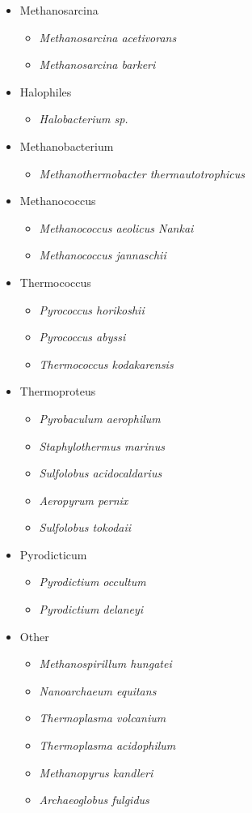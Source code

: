 \documentclass[10pt,letterpaper]{article}
\begin{document}
\begin{itemize}
	\item Methanosarcina
	\begin{itemize}
		\item \textit{Methanosarcina acetivorans}
		\item \textit{Methanosarcina barkeri}
	\end{itemize}
	\item Halophiles
	\begin{itemize}
		\item \textit{Halobacterium sp.}
	\end{itemize}
	\item Methanobacterium
	\begin{itemize}
		\item \textit{Methanothermobacter thermautotrophicus}
	\end{itemize}
	\item Methanococcus
	\begin{itemize}
		\item \textit{Methanococcus aeolicus Nankai}
		\item \textit{Methanococcus jannaschii}
	\end{itemize}
	\item Thermococcus
	\begin{itemize}
		\item \textit{Pyrococcus horikoshii}
		\item \textit{Pyrococcus abyssi}
		\item \textit{Thermococcus kodakarensis}
	\end{itemize}
	\item Thermoproteus
	\begin{itemize}
		\item \textit{Pyrobaculum aerophilum}
		\item \textit{Staphylothermus marinus}
		\item \textit{Sulfolobus acidocaldarius}
		\item \textit{Aeropyrum pernix}
		\item \textit{Sulfolobus tokodaii}
	\end{itemize}
	\item Pyrodicticum
	\begin{itemize}
		\item \textit{Pyrodictium occultum}
		\item \textit{Pyrodictium delaneyi}
	\end{itemize}
	\item Other
	\begin{itemize}
		\item \textit{Methanospirillum hungatei}
		\item \textit{Nanoarchaeum equitans}
		\item \textit{Thermoplasma volcanium}
		\item \textit{Thermoplasma acidophilum}
		\item \textit{Methanopyrus kandleri}
		\item \textit{Archaeoglobus fulgidus}
	\end{itemize}
\end{itemize}
\end{document}
